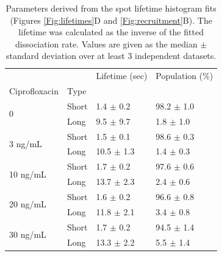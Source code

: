 \begin{table}[htbp]
    \centering
    \caption{Parameters derived from the spot lifetime histogram fits (Figures \ref{Fig:lifetimes}D and \ref{Fig:recruitment}B). The lifetime was calculated as the inverse of the fitted dissociation rate. Values are given as the median $\pm$ standard deviation over at least 3 independent datasets.}
    \begin{tabular}{llll}
        \toprule
         &  & Lifetime (sec) & Population (\%) \\
        Ciprofloxacin & Type &  &  \\
        \midrule
        \multirow[t]{2}{*}{0} & Short & 1.4 $\pm$ 0.2 & 98.2 $\pm$ 1.0 \\
         & Long & 9.5 $\pm$ 9.7 & 1.8 $\pm$ 1.0 \\
        \cline{1-4}
        \multirow[t]{2}{*}{3 ng/mL} & Short & 1.5 $\pm$ 0.1 & 98.6 $\pm$ 0.3 \\
         & Long & 10.5 $\pm$ 1.3 & 1.4 $\pm$ 0.3 \\
        \cline{1-4}
        \multirow[t]{2}{*}{10 ng/mL} & Short & 1.7 $\pm$ 0.2 & 97.6 $\pm$ 0.6 \\
         & Long & 13.7 $\pm$ 2.3 & 2.4 $\pm$ 0.6 \\
        \cline{1-4}
        \multirow[t]{2}{*}{20 ng/mL} & Short & 1.6 $\pm$ 0.2 & 96.6 $\pm$ 0.8 \\
         & Long & 11.8 $\pm$ 2.1 & 3.4 $\pm$ 0.8 \\
        \cline{1-4}
        \multirow[t]{2}{*}{30 ng/mL} & Short & 1.7 $\pm$ 0.2 & 94.5 $\pm$ 1.4 \\
         & Long & 13.3 $\pm$ 2.2 & 5.5 $\pm$ 1.4 \\
        \cline{1-4}
        \bottomrule
        \end{tabular}
    \label{tab:fit_results}
\end{table}


